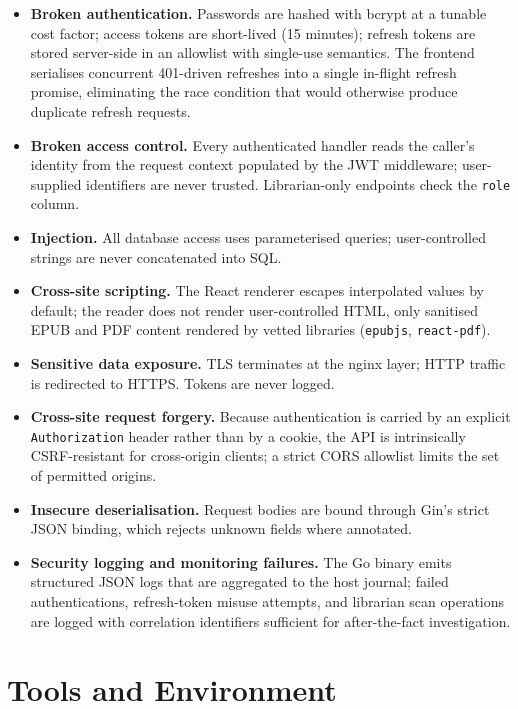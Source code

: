 \documentclass[12pt,a4paper]{report}
\begin{document}
\begin{itemize}[leftmargin=*]
    \item \textbf{Broken authentication.} Passwords are hashed with
    bcrypt at a tunable cost factor; access tokens are short-lived (15
    minutes); refresh tokens are stored server-side in an allowlist with
    single-use semantics. The frontend serialises concurrent
    401-driven refreshes into a single in-flight refresh promise,
    eliminating the race condition that would otherwise produce
    duplicate refresh requests.
    \item \textbf{Broken access control.} Every authenticated handler
    reads the caller's identity from the request context populated by
    the JWT middleware; user-supplied identifiers are never trusted.
    Librarian-only endpoints check the \texttt{role} column.
    \item \textbf{Injection.} All database access uses parameterised
    queries; user-controlled strings are never concatenated into SQL.
    \item \textbf{Cross-site scripting.} The React renderer escapes
    interpolated values by default; the reader does not render
    user-controlled HTML, only sanitised EPUB and PDF content rendered
    by vetted libraries (\texttt{epubjs}, \texttt{react-pdf}).
    \item \textbf{Sensitive data exposure.} TLS terminates at the nginx
    layer; HTTP traffic is redirected to HTTPS. Tokens are never logged.
    \item \textbf{Cross-site request forgery.} Because authentication is
    carried by an explicit \texttt{Authorization} header rather than by
    a cookie, the API is intrinsically CSRF-resistant for cross-origin
    clients; a strict CORS allowlist limits the set of permitted
    origins.
    \item \textbf{Insecure deserialisation.} Request bodies are bound
    through Gin's strict JSON binding, which rejects unknown fields
    where annotated.
    \item \textbf{Security logging and monitoring failures.} The Go
    binary emits structured JSON logs that are aggregated to the host
    journal; failed authentications, refresh-token misuse attempts, and
    librarian scan operations are logged with correlation identifiers
    sufficient for after-the-fact investigation.
\end{itemize}

\section{Tools and Environment}
\end{document}
